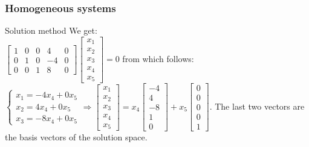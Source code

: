\begin{frame}
	\frametitle{Homogeneous systems}
	\begin{block}{Solution method}
		We get:\\
		$\begin{bmatrix}
		1 & 0 & 0 & 4 & 0\\
		0 & 1 & 0 & -4 & 0\\
		0 & 0 & 1 & 8 & 0
		\end{bmatrix}\begin{bmatrix}
		x_1\\ x_2\\ x_3\\ x_4\\ x_5
		\end{bmatrix}=0$ from which follows:\\
		$\begin{cases}
		x_1=-4x_4+0x_5\\
		x_2=4x_4+0x_5\\
		x_3=-8x_4+0x_5
		\end{cases} \Rightarrow \begin{bmatrix}
		x_1\\ x_2\\ x_3\\ x_4\\ x_5
		\end{bmatrix}=x_4\begin{bmatrix}
		-4\\4\\-8\\1\\0
		\end{bmatrix}+x_5\begin{bmatrix}
		0\\0\\0\\0\\1
		\end{bmatrix}$. The last two vectors are the basis vectors of the solution space.
	\end{block}
\end{frame}

